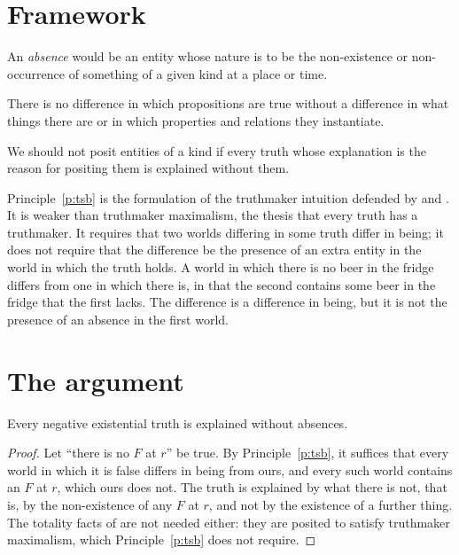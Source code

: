 \documentclass{situationist-preprint}
\begin{document}
\section{Framework}

\begin{definition}\label{d:absence}
An \emph{absence} would be an entity whose nature is to be the non-existence or non-occurrence of something of a given kind at a place or time.
\end{definition}

\begin{principle}\label{p:tsb}
There is no difference in which propositions are true without a difference in what things there are or in which properties and relations they instantiate.
\end{principle}

\begin{principle}\label{p:idle}
We should not posit entities of a kind if every truth whose explanation is the reason for positing them is explained without them.
\end{principle}

Principle~\ref{p:tsb} is the formulation of the truthmaker intuition defended by \citet{Bigelow1988} and \citet{Lewis2001}. It is weaker than truthmaker maximalism, the thesis that every truth has a truthmaker. It requires that two worlds differing in some truth differ in being; it does not require that the difference be the presence of an extra entity in the world in which the truth holds. A world in which there is no beer in the fridge differs from one in which there is, in that the second contains some beer in the fridge that the first lacks. The difference is a difference in being, but it is not the presence of an absence in the first world.

\section{The argument}

\begin{lemma}\label{l:neg}
Every negative existential truth is explained without absences.
\end{lemma}

\begin{proof}
Let \enquote{there is no $F$ at $r$} be true. By Principle~\ref{p:tsb}, it suffices that every world in which it is false differs in being from ours, and every such world contains an $F$ at $r$, which ours does not. The truth is explained by what there is not, that is, by the non-existence of any $F$ at $r$, and not by the existence of a further thing. The totality facts of \citet{Armstrong2004} are not needed either: they are posited to satisfy truthmaker maximalism, which Principle~\ref{p:tsb} does not require.
\end{proof}
\end{document}
